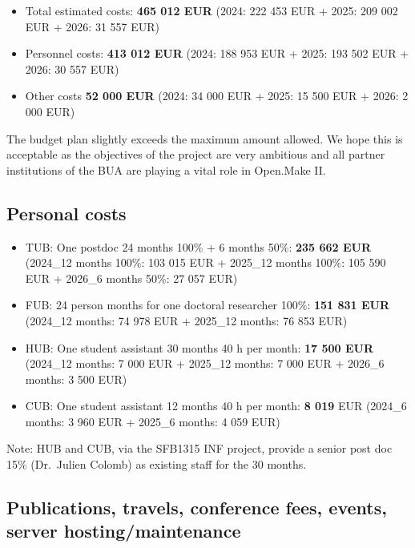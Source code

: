 \documentclass[
  12pt,
  a4paper,
]{article}
\providecommand{\tightlist}{%
  \setlength{\itemsep}{0pt}\setlength{\parskip}{0pt}}
\begin{document}
\begin{itemize}
\tightlist
\item
  Total estimated costs: \textbf{465 012 EUR} (2024: 222 453 EUR + 2025:
  209 002 EUR + 2026: 31 557 EUR)
\item
  Personnel costs: \textbf{413 012 EUR} (2024: 188 953 EUR + 2025: 193
  502 EUR + 2026: 30 557 EUR)
\item
  Other costs \textbf{52 000 EUR} (2024: 34 000 EUR + 2025: 15 500 EUR +
  2026: 2 000 EUR)
\end{itemize}

The budget plan slightly exceeds the maximum amount allowed. We hope
this is acceptable as the objectives of the project are very ambitious
and all partner institutions of the BUA are playing a vital role in
Open.Make II.

\hypertarget{personal-costs}{%
\subsection{Personal costs}\label{personal-costs}}

\begin{itemize}
\tightlist
\item
  TUB: One postdoc 24 months 100\% + 6 months 50\%: \textbf{235 662 EUR}
  (2024\_12 months 100\%: 103 015 EUR + 2025\_12 months 100\%: 105 590
  EUR + 2026\_6 months 50\%: 27 057 EUR)
\item
  FUB: 24 person months for one doctoral researcher 100\%: \textbf{151
  831 EUR} (2024\_12 months: 74 978 EUR + 2025\_12 months: 76 853 EUR)
\item
  HUB: One student assistant 30 months 40 h per month: \textbf{17 500
  EUR} (2024\_12 months: 7 000 EUR + 2025\_12 months: 7 000 EUR +
  2026\_6 months: 3 500 EUR)
\item
  CUB: One student assistant 12 months 40 h per month: \textbf{8 019}
  EUR (2024\_6 months: 3 960 EUR + 2025\_6 months: 4 059 EUR)
\end{itemize}

Note: HUB and CUB, via the SFB1315 INF project, provide a senior post
doc 15\% (Dr.~Julien Colomb) as existing staff for the 30 months.

\hypertarget{publications-travels-conference-fees-events-server-hostingmaintenance}{%
\subsection{Publications, travels, conference fees, events, server
hosting/maintenance}\label{publications-travels-conference-fees-events-server-hostingmaintenance}}
\end{document}

